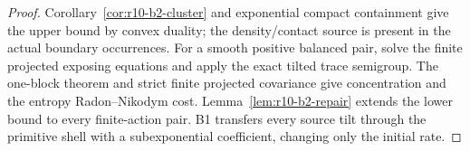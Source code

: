 \begin{proof}
Corollary~\ref{cor:r10-b2-cluster} and exponential compact containment give
the upper bound by convex duality; the density/contact source is present in
the actual boundary occurrences.  For a smooth positive balanced pair, solve
the finite projected exposing equations and apply the exact tilted trace
semigroup.  The one-block theorem and strict finite projected covariance give
concentration and the entropy Radon--Nikodym cost.  Lemma~\ref{lem:r10-b2-repair}
extends the lower bound to every finite-action pair.  B1 transfers every
source tilt through the primitive shell with a subexponential coefficient,
changing only the initial rate.
\end{proof}
